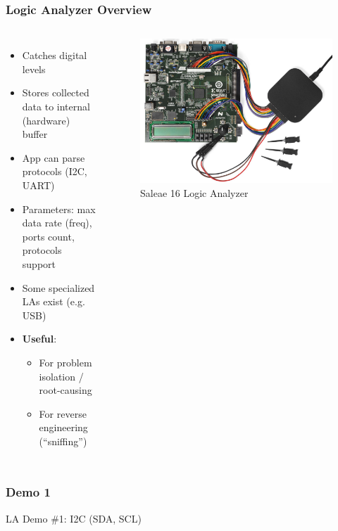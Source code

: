 \begin{frame}
  \frametitle{Logic Analyzer Overview}
  \begin{columns}
    \begin{itemize}
      \item Catches digital levels
      \item Stores collected data to internal (hardware) buffer
      \item App can parse protocols (I2C, UART)
      \item Parameters: max data rate (freq), ports count, protocols support
      \item Some specialized LAs exist (e.g. USB)
      \item \textbf{Useful}:
        \begin{itemize}
          \item For problem isolation / root-causing
          \item For reverse engineering (``sniffing'')
        \end{itemize}
    \end{itemize}
    \begin{figure}
      \centering
      \hspace*{-2mm}\includegraphics[scale=0.17]{images/saleae-la.jpg}
      \caption{Saleae 16 Logic Analyzer}
    \end{figure}
  \end{columns}
\end{frame}

\begin{frame}[standout]
  \frametitle{Demo 1}
  LA Demo \#1: I2C (SDA, SCL)
\end{frame}

